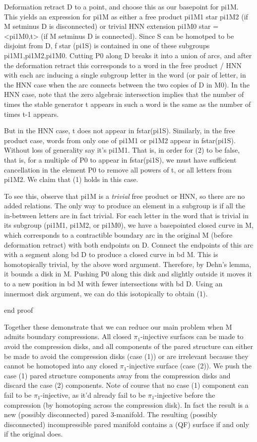 Deformation retract D to a point, and choose this as our basepoint for pi1M.
This yields an expression for pi1M as either a free product pi1M1 star pi1M2
(if M setminus D is disconnected) or trivial HNN extension pi1M0 star
= <pi1M0,t> (if M setminus D is connected). Since S can be homotped to be
disjoint from D, f star (pi1S) is contained in one of these subgroups
pi1M1,pi1M2,pi1M0.  Cutting P0 along D breaks it into a union of arcs, and
after the deformation retract this corresponds to a word in the free product
/ HNN with each arc inducing a single subgroup letter in the word (or pair of
letter, in the HNN case when the arc connects between the two copies of D in
M0).  In the HNN case, note that the zero algebraic intersection implies that
the number of times the stable generator t appears in such a word is the same
as the number of times t-1 appears.

But in the HNN case, t does not appear in fstar(pi1S).  Similarly, in the free
product case, words from only one of pi1M1 or pi1M2 appear in fstar(pi1S).
Without loss of generality say it's pi1M1. That is, in order for (2) to be
false, that is, for a multiple of P0 to appear in fstar(pi1S), we must have
sufficient cancellation in the element P0 to remove all powers of t, or all
letters from pi1M2. We claim that (1) holds in this case.

To see this, observe that pi1M is a \emph{trivial} free product or HNN, so
there are no added relations. The only way to produce an element in a subgroup
is if all the in-between letters are in fact trivial. For each letter in the
word that is trivial in its subgroup (pi1M1, pi1M2, or pi1M0), we have
a basepointed closed curve in M, which corresponds to a contractible boundary
arc in the original M (before deformation retract) with both endpoints on D.
Connect the endpoints of this arc with a segment along bd D to produce a closed
curve in bd M. This is homotopically trivial, by the above word argument.
Therefore, by Dehn's lemma, it bounds a disk in M. Pushing P0 along this disk
and slightly outside it moves it to a new position in bd M with fewer
intersections with bd D. Using an innermost disk argument, we can do this
isotopically to obtain (1).

end proof

Together these demonstrate that we can reduce our main problem when M admits
boundary compressions. All closed $\pi_1$-injective surfaces can be made to
avoid the compression disks, and all components of the pared structure can
either be made to avoid the compression disks (case (1)) or are irrelevant
because they cannot be homotoped into any closed $\pi_1$-injective surface
(case (2)). We push the case (1) pared structure components away from the
compression disks and discard the case (2) components. Note of course that no
case (1) component can fail to be $\pi_1$-injective, as it'd already fail to be
$\pi_1$-injective before the compression (by homotoping across the compression
disk). In fact the result is a new (possibly disconnected) pared 3-manifold.
The resulting (possibly disconnected) incompressible pared manifold contains
a (QF) surface if and only if the original does.


